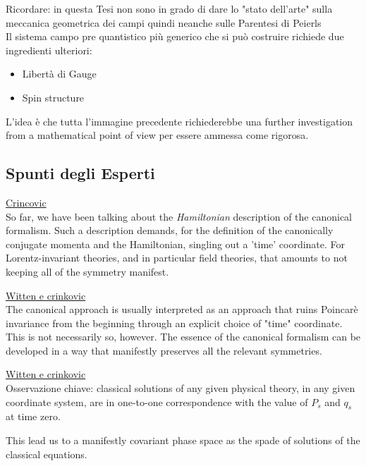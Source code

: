 \documentclass[Main]{subfiles}
\begin{document}
	\begin{Warning}
		Ricordare: in questa Tesi non sono in grado di dare lo "stato dell'arte"  sulla meccanica geometrica dei campi quindi neanche sulle Parentesi di Peierls\\
		Il sistema campo pre quantistico più generico che si può costruire richiede due ingredienti ulteriori:
			\begin{itemize}
				\item Libertà di Gauge
				\item Spin structure
			\end{itemize}		
			L'idea è che tutta l'immagine precedente richiederebbe una further investigation from a mathematical point of view per essere ammessa come rigorosa.
	\end{Warning}
		
		
	\subsection{Spunti degli Esperti}
	
	
			\begin{Warning}
			\underline{Crincovic}\cite{Crnkovic1999}\\
			So far, we have been talking about the \emph{Hamiltonian} description of the canonical formalism.
			Such a description demands, for the definition of the canonically conjugate momenta and the Hamiltonian, singling out a 'time' coordinate. 
			For Lorentz-invariant theories, and in particular field theories, that amounts to not keeping all of the symmetry manifest. 
		\end{Warning}
		
		\begin{Warning}
			\underline{Witten e crinkovic}\\
			The canonical approach is usually interpreted as an approach that ruins Poincarè invariance from the beginning through an explicit choice of "time" coordinate.
			This is not necessarily so, however. The essence of the canonical formalism can be developed in a way that manifestly preserves all the relevant symmetries.		
		\end{Warning}
		
		\begin{Warning}
			\underline{Witten e crinkovic}\\
			Osservazione chiave:
			classical solutions of any given physical theory, in any given coordinate system, are in one-to-one correspondence with the value of $P_s$ and $q_s$ at time zero.
			
			This lead us to a manifestly covariant phase space as the spade of solutions of the classical equations.
		\end{Warning}
		
\end{document}
